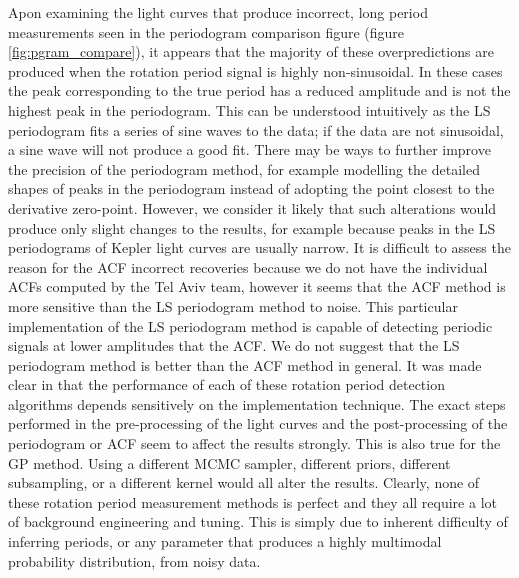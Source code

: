 \documentclass[a4paper,fleqn,usenatbib,useAMS]{mnras}
\newcommand{\response}[1]{{#1}}
\begin{document}
\response{Apon examining the light curves that produce incorrect, long period
measurements seen in the periodogram comparison figure (figure
\ref{fig:pgram_compare}), it appears that the majority of these
overpredictions are produced when the rotation period signal is highly
non-sinusoidal.
In these cases the peak corresponding to the true period has a reduced
amplitude and is not the highest peak in the periodogram.
This can be understood intuitively as the LS periodogram fits a series of sine
waves to the data; if the data are not sinusoidal, a sine wave will not
produce a good fit.
There may be ways to further improve the precision of the periodogram method,
for example modelling the detailed shapes of peaks in the periodogram instead
of adopting the point closest to the derivative zero-point.
However, we consider it likely that such alterations would produce only slight
changes to the results, for example because peaks in the LS periodograms of
Kepler light curves are usually narrow.
It is difficult to assess the reason for the ACF incorrect recoveries because
we do not have the individual ACFs computed by the \citet{Aigrain2015} Tel
Aviv team, however it seems that the ACF method is more sensitive than the LS
periodogram method to noise.
This particular implementation of the LS periodogram method is capable of
detecting periodic signals at lower amplitudes that the ACF.
We do not suggest that the LS periodogram method is better than the ACF method
in general.
It was made clear in \citet{Aigrain2015} that the performance of each of these
rotation period detection algorithms depends sensitively on the
implementation technique.
The exact steps performed in the pre-processing of the light curves and the
post-processing of the periodogram or ACF seem to affect the results strongly.
This is also true for the GP method.
Using a different MCMC sampler, different priors, different subsampling, or a
different kernel would all alter the results.
Clearly, none of these rotation period measurement methods is perfect and they
all require a lot of background engineering and tuning.
This is simply due to inherent difficulty of inferring periods, or any
parameter that produces a highly multimodal probability distribution, from
noisy data.}
\end{document}
